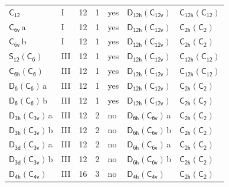 \documentclass[10pt,a4paper]{article}
\numberwithin{equation}{section}
\newcommand{\grp}[1]{\mathsf{#1}}
\newcommand{\clsletter}[1]{\,{\scriptsize\color{black!55}#1}}
\begin{document}
{\begin{longtable}{@{}llrrlll@{}}
\href{../../../rotation/data/pdf/C12.pdf}{$\grp{C_{12}}$} & I & 12 & 1 & yes & \href{D12h-C12v.pdf}{$\grp{D_{12h}}(\grp{C_{12v}})$} & \href{C12h-C12.pdf}{$\grp{C_{12h}}(\grp{C_{12}})$}\\
\href{../../../rotation/data/pdf/C6v.pdf}{$\grp{C_{6v}}$}\clsletter{a} & I & 12 & 1 & yes & \href{D12h-C12v.pdf}{$\grp{D_{12h}}(\grp{C_{12v}})$} & \href{C2h-C2.pdf}{$\grp{C_{2h}}(\grp{C_{2}})$}\\
\href{../../../rotation/data/pdf/C6v.pdf}{$\grp{C_{6v}}$}\clsletter{b} & I & 12 & 1 & yes & \href{D12h-C12v.pdf}{$\grp{D_{12h}}(\grp{C_{12v}})$} & \href{C2h-C2.pdf}{$\grp{C_{2h}}(\grp{C_{2}})$}\\
\href{S12-C6.pdf}{$\grp{S_{12}}(\grp{C_{6}})$} & III & 12 & 1 & yes & \href{D12h-C12v.pdf}{$\grp{D_{12h}}(\grp{C_{12v}})$} & \href{C12h-C12.pdf}{$\grp{C_{12h}}(\grp{C_{12}})$}\\
\href{C6h-C6.pdf}{$\grp{C_{6h}}(\grp{C_{6}})$} & III & 12 & 1 & yes & \href{D12h-C12v.pdf}{$\grp{D_{12h}}(\grp{C_{12v}})$} & \href{C12h-C12.pdf}{$\grp{C_{12h}}(\grp{C_{12}})$}\\
\href{D6-C6.pdf}{$\grp{D_{6}}(\grp{C_{6}})$}\clsletter{a} & III & 12 & 1 & yes & \href{D12h-C12v.pdf}{$\grp{D_{12h}}(\grp{C_{12v}})$} & \href{C2h-C2.pdf}{$\grp{C_{2h}}(\grp{C_{2}})$}\\
\href{D6-C6.pdf}{$\grp{D_{6}}(\grp{C_{6}})$}\clsletter{b} & III & 12 & 1 & yes & \href{D12h-C12v.pdf}{$\grp{D_{12h}}(\grp{C_{12v}})$} & \href{C2h-C2.pdf}{$\grp{C_{2h}}(\grp{C_{2}})$}\\
\href{D3h-C3v.pdf}{$\grp{D_{3h}}(\grp{C_{3v}})$}\clsletter{a} & III & 12 & 2 & no & \href{D6h-C6v.pdf}{$\grp{D_{6h}}(\grp{C_{6v}})$}\clsletter{a} & \href{C2h-C2.pdf}{$\grp{C_{2h}}(\grp{C_{2}})$}\\
\href{D3h-C3v.pdf}{$\grp{D_{3h}}(\grp{C_{3v}})$}\clsletter{b} & III & 12 & 2 & no & \href{D6h-C6v.pdf}{$\grp{D_{6h}}(\grp{C_{6v}})$}\clsletter{b} & \href{C2h-C2.pdf}{$\grp{C_{2h}}(\grp{C_{2}})$}\\
\href{D3d-C3v.pdf}{$\grp{D_{3d}}(\grp{C_{3v}})$}\clsletter{a} & III & 12 & 2 & no & \href{D6h-C6v.pdf}{$\grp{D_{6h}}(\grp{C_{6v}})$}\clsletter{a} & \href{C2h-C2.pdf}{$\grp{C_{2h}}(\grp{C_{2}})$}\\
\href{D3d-C3v.pdf}{$\grp{D_{3d}}(\grp{C_{3v}})$}\clsletter{b} & III & 12 & 2 & no & \href{D6h-C6v.pdf}{$\grp{D_{6h}}(\grp{C_{6v}})$}\clsletter{b} & \href{C2h-C2.pdf}{$\grp{C_{2h}}(\grp{C_{2}})$}\\
\href{D4h-C4v.pdf}{$\grp{D_{4h}}(\grp{C_{4v}})$} & III & 16 & 3 & no & \href{D4h-C4v.pdf}{$\grp{D_{4h}}(\grp{C_{4v}})$} & \href{C2h-C2.pdf}{$\grp{C_{2h}}(\grp{C_{2}})$}\\

\end{longtable}}
\end{document}
